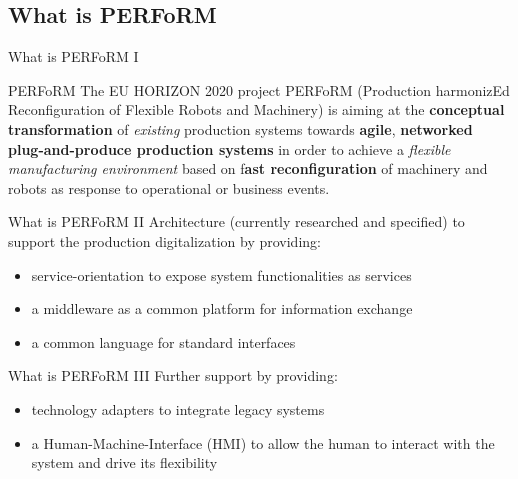 \documentclass[12pt, xcolor=dvipsnames]{beamer}
\begin{document}
\subsection{What is PERFoRM}
\begin{frame}{What is PERFoRM I}
	\begin{exampleblock}{PERFoRM}
		The EU HORIZON 2020 project PERFoRM (Production harmonizEd Reconfiguration of Flexible Robots and Machinery) is aiming at the \textbf{conceptual transformation} of \emph{existing} production systems towards \textbf{agile}, \textbf{networked plug-and-produce production systems} in order to achieve a \emph{flexible manufacturing environment} based on f\textbf{ast reconfiguration} of machinery and robots as response to operational or business events. \cite{Harmonized}
	\end{exampleblock}
\end{frame}

\begin{frame}{What is PERFoRM II}
	Architecture (currently researched and specified) to support the production digitalization by providing:
	\newline 
	\begin{itemize}
		\item service-orientation to expose system functionalities as services
		\newline
		
		\item a middleware as a common platform for information exchange
		\newline
		
		\item a common language for standard interfaces
		\newline  
	\end{itemize}
\end{frame}

\begin{frame}{What is PERFoRM III}
	Further support by providing:
	\newline
	\begin{itemize}
		\item technology adapters to integrate legacy systems
		\newline
		
		\item a Human-Machine-Interface (HMI) to allow the human to interact with the system and drive its flexibility
	\end{itemize}
\end{frame}
\end{document}
